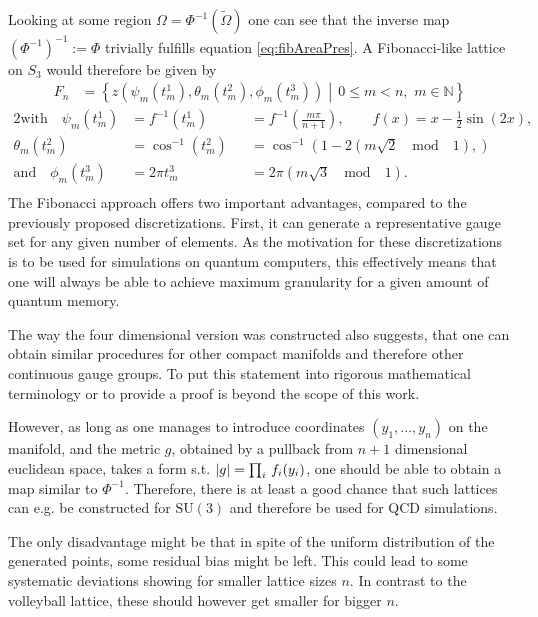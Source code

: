 Looking at some region $\Omega = \Phi^{-1} (\tilde{\Omega})$ one can see that the inverse map $(\Phi^{-1})^{-1} := \Phi$ trivially fulfills equation \ref{eq:fibAreaPres}. A Fibonacci-like lattice on $S_3$ would therefore be given by
\begin{align*}
 F_n & = \left\{ z\left(\psi_m(t_m^1), \theta_m(t_m^2), \phi_m(t_m^3)\right)  \middle| \, 0 \le m < n, \, \, m \in \mathbb{N} \right\}
\end{align*}
\begin{alignat*}{2}
 \textrm{with} \quad \psi_m(t_m^1) & =  f^{-1} \left( t_m^1 \right)  &  & = f^{-1} \left( \frac{m\pi}{n+1}\right), \qquad f(x) = x - \frac{1}{2} \sin(2x) ,                                                                     \\
 \theta_m(t_m^2)                   & =  \cos^{-1}\left(t_m^2 \right) &  & =  \cos^{-1}\left(1-2(m\sqrt{2} \quad \mathrm{mod} \quad 1), \right)                                                                                  \\
 \textrm{and} \quad \phi_m (t_m^3) & =  2 \pi t^3_m                  &  & =                        2 \pi (m\sqrt{3} \quad \mathrm{mod} \quad 1)                                                                      \textrm{.} \\
\end{alignat*}
The Fibonacci approach offers two important advantages, compared to the previously proposed discretizations. First, it can generate a representative gauge set for any given number of elements. As the motivation for these discretizations is to be used for simulations on quantum computers, this effectively means that one will always be able to achieve maximum granularity for a given amount of quantum memory.

The way the four dimensional version was constructed also suggests, that one can obtain similar procedures for other compact manifolds and therefore other continuous gauge groups. To put this statement into rigorous mathematical terminology or to provide a proof is beyond the scope of this work.

However, as long as one manages to introduce coordinates $(y_1, ..., y_n)$ on the manifold, and the metric $g$, obtained by a pullback from $n+1$ dimensional euclidean space, takes a form s.t. $\abs{g} = \prod_{i} \, f_i(y_i)$, one should be able to obtain a map similar to $\Phi^{-1}$. Therefore, there is at least a good chance that such lattices can e.g. be constructed for $\textrm{SU}(3)$ and therefore be used for QCD simulations.

The only disadvantage might be that in spite of the uniform distribution of the generated points, some residual bias might be left. This could lead to some systematic deviations showing for smaller lattice sizes $n$. In contrast to the volleyball lattice, these should however get smaller for bigger $n$.
